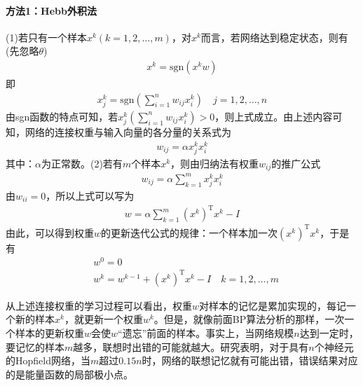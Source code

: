             \paragraph{方法1：Hebb外积法}(1)若只有一个样本$x^k(k=1,2,\dots,m)$，对$x^k$而言，若网络达到稳定状态，则有(先忽略$\theta$)
            \begin{align*}
            x^k = \mathrm{sgn}(x^kw)
            \end{align*}
            即
            \begin{align*}
            x_j^k = \mathrm{sgn} \left( \sum_{i=1}^n w_{ij}x_i^k \right) \quad j=1,2,\dots,n
            \end{align*}
            由sgn函数的特点可知，若$x_j^k\left( \sum_{i=1}^n w_{ij}x_i^k \right)>0$，则上式成立。由上述内容可知，网络的连接权重与输入向量的各分量的关系式为
            \begin{align*}
            w_{ij} = \alpha x_j^kx_i^k
            \end{align*}
            其中：$\alpha$为正常数。(2)若有$m$个样本$x^k$，则由归纳法有权重$w_{ij}$的推广公式
            \begin{align*}
            w_{ij}  = \alpha \sum_{k=1}^mx_j^kx_i^k
            \end{align*}
            由$w_{ii} = 0$，所以上式可以写为
            \begin{align*}
            w = \alpha  \sum_{k=1}^m(x^k)^\mathrm{T}x^k - I
            \end{align*}
            由此，可以得到权重$w$的更新迭代公式的规律：一个样本加一次$(x^k)^\mathrm{T}x^k$，于是有
            \begin{align*}
            & w^0 = 0\\
            & w^k = w^{k-1}+(x^k)^\mathrm{T}x^k - I \quad k = 1,2,\dots,m
            \end{align*}
            \par
            从上述连接权重的学习过程可以看出，权重$w$对样本的记忆是累加实现的，每记一个新的样本$x^k$，就更新一个权重$w^k$。但是，就像前面BP算法分析的那样，一次一个样本的更新权重$w$会使$w$“遗忘”前面的样本。事实上，当网络规模$n$达到一定时，要记忆的样本$m$越多，联想时出错的可能就越大。研究表明，对于具有$n$个神经元的Hopfield网络，当$m$超过$0.15n$时，网络的联想记忆就有可能出错，错误结果对应的是能量函数的局部极小点。
